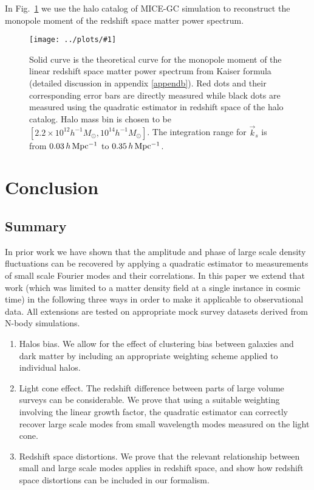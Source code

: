 \documentclass[prd,amsmath,amssymb,floatfix,superscriptaddress,nofootinbib,twocolumn]{revtex4-1}
\newcommand{\vk}{\vec{k}}
\newcommand{\rf}[1]{\ref{fig:#1}}
\newcommand{\sfig}[2]{
\texttt{[image: ../plots/\#1]}
        }
\newcommand{\Sfig}[2]{
   \begin{figure}[thbp]
   \begin{center}
    \sfig{../plots/#1.pdf}{\columnwidth}
    \caption{{\small #2}}
    \label{fig:#1}
     \end{center}
   \end{figure}
}
\begin{document}
In Fig.~\rf{SN_RS} we use the halo catalog of MICE-GC simulation to reconstruct the monopole moment of the redshift space matter power spectrum.

\Sfig{SN_RS}{Solid curve is the theoretical curve for the monopole moment of the linear redshift space matter power spectrum from Kaiser formula (detailed discussion in appendix \ref{appendb}). Red dots and their corresponding error bars are directly measured while black dots are measured using the quadratic estimator in redshift space of the halo catalog. Halo mass bin is chosen to be $[2.2 \times 10^{12}h^{-1}M_{\odot},10^{14}h^{-1}M_{\odot}]$. The integration range for $\vk_s$ is from $0.03 \,h \,\rm Mpc^{-1}$ to $0.35\,h\,\rm Mpc^{-1}$.}

\section{Conclusion} \label{sec8}
\subsection{Summary}
In prior work \cite{Li:2020fir} we have shown that the amplitude and phase of large scale density fluctuations can be recovered by applying a quadratic estimator to measurements of small scale Fourier  modes and their correlations. In this paper we extend that work (which was limited to a matter density field at a single instance in cosmic time) in the following three ways in order to make it applicable to observational data. All extensions are tested on appropriate mock survey datasets derived from N-body simulations.

\begin{enumerate}
\item  Halos bias. We allow for the effect of clustering bias between galaxies and dark matter by including an appropriate weighting scheme applied to individual halos.

\item Light cone effect. The redshift difference between parts of large volume surveys can be considerable. We prove that using a suitable weighting involving the linear growth factor, the quadratic estimator can correctly recover large scale modes from small wavelength modes measured on the light cone.

\item Redshift space distortions. We prove that the relevant relationship between small and large scale modes applies in redshift space, and show how redshift space distortions can be included in our formalism.
\end{enumerate}
 
\end{document}
